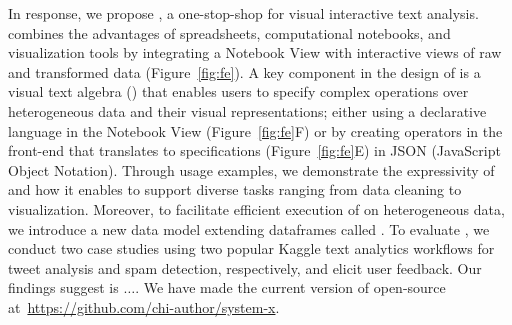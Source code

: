 
In response, we propose \system, a one-stop-shop for visual interactive text analysis. \system combines the advantages of spreadsheets, computational notebooks, and visualization tools by integrating a Notebook View with interactive views of raw and transformed data (Figure~\ref{fig:fe}). A key component in the design of \system is a visual text algebra (\vta) that enables users to specify complex \vita operations over heterogeneous data and their visual representations; either using a declarative language in the Notebook View (Figure~\ref{fig:fe}F) or by creating operators in the front-end that translates to \vta specifications (Figure~\ref{fig:fe}E) in JSON (JavaScript Object Notation). Through usage examples, we demonstrate the expressivity of \vta and how it enables \system to support diverse tasks ranging from data cleaning to visualization. Moreover, to facilitate efficient execution of \vta on heterogeneous data, we introduce a new data model extending dataframes called \vitaframe.
To evaluate \system, we conduct two case studies using two popular Kaggle text 
analytics workflows for tweet analysis and spam detection, respectively, and elicit 
user feedback. Our findings suggest \system is $\ldots$. We have made the current 
version of \system open-source at~\url{https://github.com/chi-author/system-x}.
